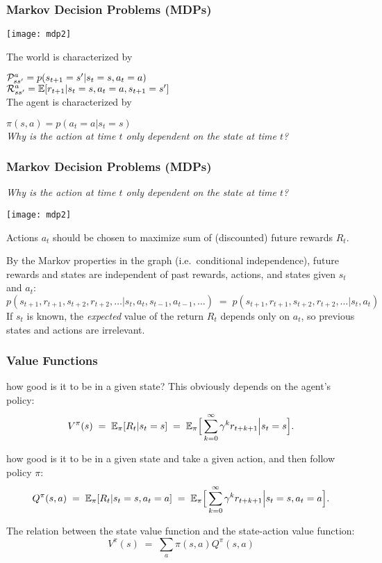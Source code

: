 \begin{frame}
\frametitle{Markov Decision Problems (MDPs)}

\centerline{\texttt{[image: mdp2]}}

The world is characterized by

 \hspace{2em}
 $ {\mathcal P}_{ss'}^a = p(s_{t+1}=s'|s_t=s,a_t=a) $ \\[1ex]

 \hspace{2em}
 $ {\mathcal R}_{ss'}^a = \mathbb{E}[r_{t+1}|s_t=s,a_t=a,s_{t+1}=s'] $ \\[2ex]

The agent is characterized by

 \hspace{2em} $\pi(s,a) = p(a_t=a|s_t=s)$ \\[1ex]

\emph{Why is the action at time $t$ only dependent on the state at time $t$?}
\end{frame}

\begin{frame}
\frametitle{Markov Decision Problems (MDPs)}

{\em Why is the action at time $t$ only dependent on the state at time $t$?}

\centerline{\texttt{[image: mdp2]}}

Actions $a_t$ should be chosen to maximize sum of (discounted)
future rewards $R_t$.

By the Markov properties in the graph (i.e.\ conditional
independence), future rewards and states are independent of past
rewards, actions, and states given $s_t$ and $a_t$:
\[
p(s_{t+1}, r_{t+1}, s_{t+2}, r_{t+2}, \ldots | s_{t}, a_{t}, s_{t-1},
a_{t-1}, \ldots )\;=\;p(s_{t+1}, r_{t+1}, s_{t+2}, r_{t+2}, \ldots |
s_{t}, a_{t}) 
\]
If $s_t$ is known, the {\em expected} value of the return $R_t$ depends only
on $a_t$, so previous states and actions are irrelevant.
\end{frame}

\begin{frame}
\frametitle{Value Functions}

 how good is it to be in a given state? This obviously depends on the agent's policy:
\[
V^\pi(s)\;=\;\mathbb{E}_{\pi}[R_t|s_t=s]\;=\;
\mathbb{E}_\pi\Big[\sum_{k=0}^\infty\gamma^k r_{t+k+1}\Big| s_t=s \Big].
\]

 how good is it to be in a given
state and take a given action, and then follow policy $\pi$:
\[
Q^\pi(s,a)\;=\;\mathbb{E}_\pi[R_t|s_t=s,a_t=a]\;=\;
\mathbb{E}_\pi\Big[\sum_{k=0}^\infty \gamma^k r_{t+k+1}\Big| s_t=s, a_t=a\Big].
\]

The relation between the state value function and the state-action value
function:
\[
V^\pi(s)\;=\;\sum_a\pi(s,a) Q^\pi(s,a)
\]
\end{frame}

